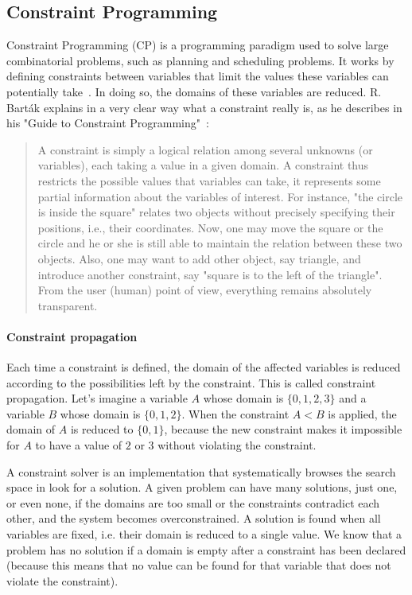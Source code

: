 \subsection{Constraint Programming}
Constraint Programming (CP) is a programming paradigm used to solve large combinatorial problems, such as planning and scheduling problems. It works by defining constraints between variables that limit the values these variables can potentially take~\cite{rossi2008constraint}. In doing so, the domains of these variables are reduced. R. Barták explains in a very clear way what a constraint really is, as he describes in his "Guide to Constraint Programming"~\cite{bartak1998constraint}:

\begin{quote}
    A constraint is simply a logical relation among several unknowns (or variables), each taking a value in a given domain. A constraint thus restricts the possible values that variables can take, it represents some partial information about the variables of interest. For instance, "the circle is inside the square" relates two objects without precisely specifying their positions, i.e., their coordinates. Now, one may move the square or the circle and he or she is still able to maintain the relation between these two objects. Also, one may want to add other object, say triangle, and introduce another constraint, say "square is to the left of the triangle". From the user (human) point of view, everything remains absolutely transparent.
\end{quote}

\paragraph{Constraint propagation}
Each time a constraint is defined, the domain of the affected variables is reduced according to the possibilities left by the constraint. This is called constraint propagation. Let's imagine a variable $A$ whose domain is $\{0, 1, 2, 3\}$ and a variable $B$ whose domain is $\{0, 1, 2\}$. When the constraint $A<B$ is applied, the domain of $A$ is reduced to $\{0, 1\}$, because the new constraint makes it impossible for $A$ to have a value of $2$ or $3$ without violating the constraint.

A constraint solver is an implementation that systematically browses the search space in look for a solution. A given problem can have many solutions, just one, or even none, if the domains are too small or the constraints contradict each other, and the system becomes overconstrained.
A solution is found when all variables are fixed, i.e. their domain is reduced to a single value. We know that a problem has no solution if a domain is empty after a constraint has been declared (because this means that no value can be found for that variable that does not violate the constraint).

